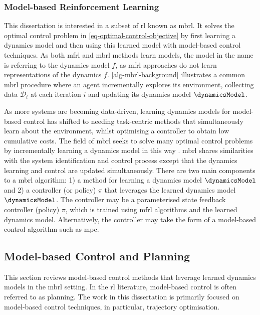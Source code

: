 \documentclass{mimosis-class/mimosis}
\numberwithin{equation}{chapter}
\begin{document}
\subsubsection{Model-based Reinforcement Learning}
\label{sec:orga235f65}
This dissertation is interested in a subset of \acrshort{rl} known as \acrfull{mbrl}.
It solves the optimal control problem in \cref{eq-optimal-control-objective}
by first learning a dynamics model and then using this learned model with model-based control techniques.
As both \acrfull{mfrl} and \acrshort{mbrl} methods learn models,
the model in the name is referring to the dynamics model \(f\), as  \acrshort{mfrl} approaches do not learn
representations of the dynamics \(f\).
\cref{alg-mbrl-background} illustrates a common \acrshort{mbrl} procedure where an agent incrementally explores
its environment, collecting data \(\mathcal{D}_i\) at each iteration \(i\) and
updating its dynamics model \(\dynamicsModel\).


As more systems are becoming data-driven, learning dynamics models for model-based control has shifted to
needing task-centric methods that simultaneously learn about the environment, whilst optimising a controller
to obtain low cumulative costs.
The field of \acrshort{mbrl} seeks to solve many optimal control problems by incrementally learning a dynamics model
in this way \citep{deisenrothPILCO2011,chuaDeep2018}.
\acrshort{mbrl} shares similarities with the system identification and control process except that the dynamics learning
and control are updated simultaneously.
There are two main components to a \acrshort{mbrl} algorithm: 1) a method for learning a dynamics
model \(\dynamicsModel\) and 2) a controller (or policy) \(\pi\) that leverages the learned dynamics model \(\dynamicsModel\).
The controller may be a parameterised state feedback controller (policy) \(\pi\), which is trained using
\acrshort{mfrl} algorithms and the learned dynamics model.
Alternatively, the controller may take the form of a model-based control algorithm such as \acrfull{mpc}.

\subsection{Model-based Control and Planning}
\label{sec:org1719bb9}
This section reviews model-based control methods that leverage learned dynamics models in the \acrshort{mbrl} setting.
In the \acrshort{rl} literature, model-based control is often referred to as planning.
The work in this dissertation is primarily focused on model-based control techniques,
in particular, trajectory optimisation.
\end{document}

